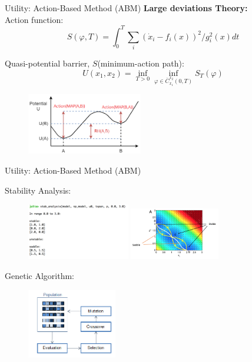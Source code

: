 \documentclass{beamer}
\begin{document}
\begin{frame}{Utility: Action-Based Method (ABM)}
\textbf{Large deviations Theory:} \\
\bigskip
Action function: \\
\begin{equation}\label{action}
S(\varphi, T)=\int_{0}^{T}\sum_{i}(\dot{x}_{i}-f_{i}(x))^{2}/g_{i}^{2}(x) dt
\end{equation}

Quasi-potential barrier, $S$(minimum-action path): \\
\begin{equation}\label{MAP}
U(x_1, x_2) = \inf_{T>0} \inf_{\varphi \in \bar{{C}}_{x_1}^{x_2}(0,T)} S_T(\varphi)
\end{equation}

\begin{figure}[h!]
\centering
\includegraphics[width=0.45\textwidth]{RH.png}
\end{figure}
\end{frame}

\begin{frame}{Utility: Action-Based Method (ABM)}

Stability Analysis:
\begin{figure}[h!]
\centering
\includegraphics[width=0.40\textwidth]{stab-ex-2D.png}
\includegraphics[width=0.35\textwidth]{stab-ex2.png}
\end{figure}

Genetic Algorithm:
\begin{figure}
\includegraphics[width=0.35\textwidth]{genetic-algorithm-process.png} 
\end{figure}
\end{frame}
\end{document}
